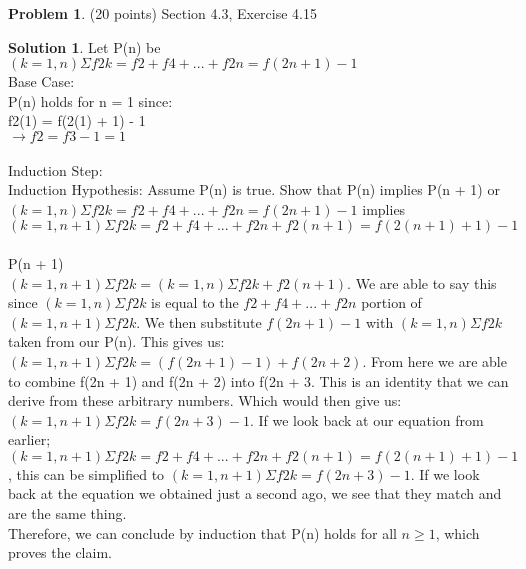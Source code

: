 \documentclass{article}
\theoremstyle{definition}
\newtheorem{problem}{Problem}
\newtheorem*{solution}{Solution}
\begin{document}
\begin{problem} (20 points) Section 4.3, Exercise 4.15
\end{problem}
\begin{solution} 
Let P(n) be $(k = 1, n)\Sigma f2k = f2 + f4 + ... + f2n = f(2n + 1) - 1$ \\
Base Case: \\
P(n) holds for n = 1 since: \\
f2(1) = f(2(1) + 1) - 1 \\
$\to f2 = f3 - 1 = 1$ \\
\\
Induction Step: \\
Induction Hypothesis: Assume P(n) is true. Show that P(n) implies P(n + 1) or $(k = 1, n)\Sigma f2k = f2 + f4 + ... + f2n = f(2n + 1) - 1$ implies \\
$(k = 1, n + 1)\Sigma f2k = f2 + f4 + ... + f2n + f2(n + 1)= f(2(n + 1) + 1) - 1$ \\
\\
P(n + 1) \\
$(k = 1, n + 1)\Sigma f2k = (k = 1, n)\Sigma f2k + f2(n + 1)$. We are able to say this since $(k = 1, n)\Sigma f2k$ is equal to the $f2 + f4 + ... + f2n$ portion of $(k = 1, n + 1)\Sigma f2k$. We then substitute $f(2n + 1) - 1$ with $(k = 1, n)\Sigma f2k$ taken from our P(n). This gives us: \\
$(k = 1, n + 1)\Sigma f2k = (f(2n + 1) - 1) + f(2n + 2)$. From here we are able to combine f(2n + 1) and f(2n + 2) into f(2n + 3. This is an identity that we can derive from these arbitrary numbers. Which would then give us: \\
$(k = 1, n + 1)\Sigma f2k = f(2n + 3) - 1$. If we look back at our equation from earlier; $(k = 1, n + 1)\Sigma f2k = f2 + f4 + ... + f2n + f2(n + 1)= f(2(n + 1) + 1) - 1$, this can be simplified to $(k = 1, n + 1)\Sigma f2k = f(2n + 3) - 1$. If we look back at the equation we obtained just a second ago, we see that they match and are the same thing. \\
Therefore, we can conclude by induction that P(n) holds for all $n \geqslant 1$, which proves the claim.
\end{solution}
\end{document}

